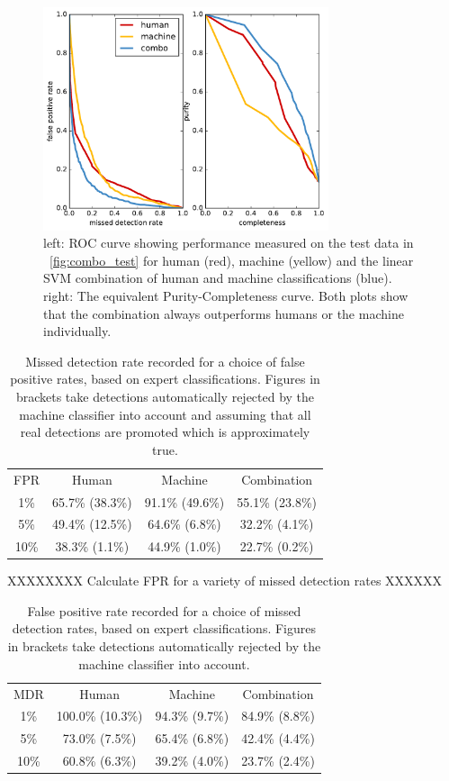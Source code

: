 \documentclass[a4paper,fleqn,usenatbib]{mnras}
\begin{document}
\begin{figure}
   \includegraphics[width=84mm]{figs/roc.pdf}
   \caption{left: ROC curve showing performance measured on the test data in ~\ref{fig:combo_test} for human (red), machine (yellow) and
            the linear SVM combination of human and machine classifications (blue).  right: The equivalent Purity-Completeness curve.  Both
            plots show that the combination always outperforms humans or the machine individually.} 
   \label{fig:roc} 
\end{figure}

\begin{table}
\begin{tabular}{|c|c|c|c|}
FPR & Human & Machine & Combination\\
1\% & 65.7\% (38.3\%) & 91.1\% (49.6\%) & 55.1\% (23.8\%)\\
5\% & 49.4\% (12.5\%) & 64.6\% (6.8\%) & 32.2\% (4.1\%)\\
10\% & 38.3\% (1.1\%) & 44.9\% (1.0\%) & 22.7\% (0.2\%)\\
\end{tabular}
\caption{Missed detection rate recorded for a choice of false positive rates, based on expert classifications.  Figures in brackets take detections automatically rejected by the machine classifier into account and assuming that all real detections are promoted which is approximately true.}\label{tab:roc}
\end{table}

XXXXXXXX Calculate FPR for a variety of missed detection rates XXXXXX

\begin{table}
\begin{tabular}{|c|c|c|c|}
MDR & Human & Machine & Combination\\
1\% & 100.0\% (10.3\%)& 94.3\% (9.7\%) & 84.9\% (8.8\%) \\
5\% & 73.0\% (7.5\%) & 65.4\% (6.8\%) & 42.4\% (4.4\%) \\
10\% & 60.8\% (6.3\%) & 39.2\% (4.0\%) & 23.7\% (2.4\%) \\
\end{tabular}
\caption{False positive rate recorded for a choice of missed detection rates, based on expert classifications.  Figures in brackets take detections automatically rejected by the machine classifier into account.}\label{tab:roc}
\end{table}
\end{document}
